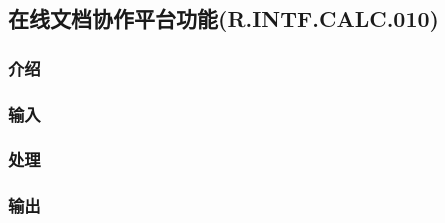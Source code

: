 \subsection{在线文档协作平台功能(R.INTF.CALC.010)}
\subsubsection{介绍}
\subsubsection{输入}
\subsubsection{处理}
\subsubsection{输出}